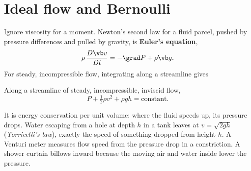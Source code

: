 \section{Ideal flow and Bernoulli}

Ignore viscosity for a moment. Newton's second law for a fluid parcel, pushed by pressure differences and pulled by gravity, is \textbf{Euler's equation},
\[
  \rho\,\frac{D\vb v}{Dt} = -\grad P + \rho\vb g .
\]
For steady, incompressible flow, integrating along a streamline gives

\begin{law}
Along a streamline of steady, incompressible, inviscid flow,
\[
  P + \tfrac12\rho v^2 + \rho g h = \text{constant}.
\]
\end{law}

It is energy conservation per unit volume: where the fluid speeds up, its pressure drops. Water escaping from a hole at depth $h$ in a tank leaves at $v = \sqrt{2gh}$ (\emph{Torricelli's law}), exactly the speed of something dropped from height $h$. A Venturi meter measures flow speed from the pressure drop in a constriction. A shower curtain billows inward because the moving air and water inside lower the pressure.

